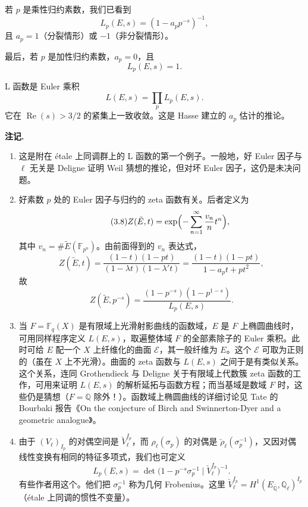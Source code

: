若 $p$ 是乘性归约素数，我们已看到
\begin{equation}\tag{3.5}\label{c5:eq:3.5}
L_p(E,s)=(1-a_pp^{-s})^{-1},
\end{equation}
且 $a_p=1$（分裂情形）或 $-1$（非分裂情形）。

最后，若 $p$ 是加性归约素数，$a_p=0$，且
\begin{equation}\tag{3.6}\label{c5:eq:3.6}
L_p(E,s)=1.
\end{equation}

L 函数是 Euler 乘积
\begin{equation}\tag{3.7}\label{c5:eq:3.7}
L(E,s)=\prod_p L_p(E,s).
\end{equation}
它在 $\operatorname{Re}(s)>3/2$ 的紧集上一致收敛。这是 Hasse 建立的 $a_p$ 估计的推论。

\par\medskip\noindent\textbf{注记.}
\begin{enumerate}
\item[(a)] 这是附在 étale 上同调群上的 L 函数的第一个例子。一般地，好 Euler 因子与 $\ell$ 无关是 Deligne 证明 Weil 猜想的推论，但对坏 Euler 因子，这仍是未决问题。
\item[(b)] 好素数 $p$ 处的 Euler 因子与归约的 zeta 函数有关。后者定义为
\begin{equation}\tag{3.8}\label{c5:eq:3.8}
Z(\tilde{E},t)=\exp\Bigl(-\sum_{n=1}^{\infty}\frac{v_n}{n}t^n\Bigr),
\end{equation}
其中 $v_n=\#\tilde{E}(\mathbb{F}_{p^n})$。由前面得到的 $v_n$ 表达式，
\begin{equation}\tag{3.9}\label{c5:eq:3.9}
Z(\tilde{E},t)=\frac{(1-t)(1-pt)}{(1-\lambda t)(1-\lambda't)}
=\frac{(1-t)(1-pt)}{1-a_pt+pt^2},
\end{equation}
故
\begin{equation}\tag{3.10}\label{c5:eq:3.10}
Z(\tilde{E},p^{-s})=\frac{(1-p^{-s})(1-p^{1-s})}{L_p(E,s)}.
\end{equation}
\item[(c)] 当 $F=\mathbb{F}_q(X)$ 是有限域上光滑射影曲线的函数域，$E$ 是 $F$ 上椭圆曲线时，可用同样程序定义 $L(E,s)$，取遍整体域 $F$ 的全部素除子的 Euler 乘积。此时可给 $E$ 配一个 $X$ 上纤维化的曲面 $\mathcal{E}$，其一般纤维为 $E$。这个 $\mathcal{E}$ 可取为正则的（虽在 $X$ 上不光滑）。曲面的 zeta 函数与 $L(E,s)$ 之间于是有类似关系。这个关系，连同 Grothendieck 与 Deligne 关于有限域上代数簇 zeta 函数的工作，可用来证明 $L(E,s)$ 的解析延拓与函数方程；而当基域是数域 $F$ 时，这些仍是猜想（$F=\mathbb{Q}$ 除外！）。函数域上椭圆曲线的详细讨论见 Tate 的 Bourbaki 报告《On the conjecture of Birch and Swinnerton-Dyer and a geometric analogue》。
\item[(d)] 由于 $(V_\ell)_{I_p}$ 的对偶空间是 $\check{V}_\ell^{I_p}$，而 $\rho_\ell(\sigma_p)$ 的对偶是 $\check{\rho}_\ell(\sigma_p^{-1})$，又因对偶线性变换有相同的特征多项式，我们也可定义
\begin{equation}\tag{3.11}\label{c5:eq:3.11}
L_p(E,s)=\det\bigl(1-p^{-s}\sigma_p^{-1}\mid\check{V}_\ell^{I_p}\bigr)^{-1}.
\end{equation}
有些作者用这个。他们把 $\sigma_p^{-1}$ 称为几何 Frobenius。这里 $\check{V}_\ell^{I_p}=H^1(E_{\overline{\mathbb{Q}}},\mathbb{Q}_\ell)^{I_p}$（étale 上同调的惯性不变量）。
\end{enumerate}


